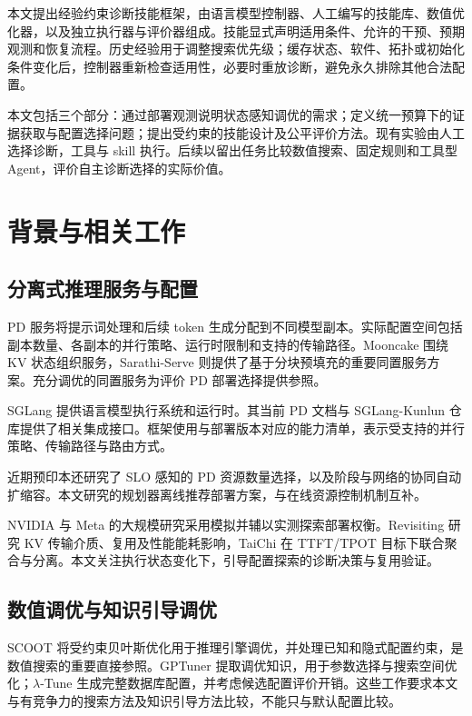 \documentclass[UTF8,11pt,a4paper,fontset=windows]{ctexart}
\begin{document}
本文提出经验约束诊断技能框架，由语言模型控制器、人工编写的技能库、数值优化器，以及独立执行器与评价器组成。技能显式声明适用条件、允许的干预、预期观测和恢复流程。历史经验用于调整搜索优先级；缓存状态、软件、拓扑或初始化条件变化后，控制器重新检查适用性，必要时重放诊断，避免永久排除其他合法配置。

本文包括三个部分：通过部署观测说明状态感知调优的需求；定义统一预算下的证据获取与配置选择问题；提出受约束的技能设计及公平评价方法。现有实验由人工选择诊断，工具与 skill 执行。后续以留出任务比较数值搜索、固定规则和工具型 Agent，评价自主诊断选择的实际价值。

\section{背景与相关工作}
\subsection{分离式推理服务与配置}
PD 服务将提示词处理和后续 token 生成分配到不同模型副本。实际配置空间包括副本数量、各副本的并行策略、运行时限制和支持的传输路径。Mooncake 围绕 KV 状态组织服务，Sarathi-Serve 则提供了基于分块预填充的重要同置服务方案\cite{mooncake2024,sarathi2024}。充分调优的同置服务为评价 PD 部署选择提供参照。

SGLang 提供语言模型执行系统和运行时\cite{sglang2024}。其当前 PD 文档与 SGLang-Kunlun 仓库提供了相关集成接口\cite{sglangpd,kunlunplugin}。框架使用与部署版本对应的能力清单，表示受支持的并行策略、传输路径与路由方式。

近期预印本还研究了 SLO 感知的 PD 资源数量选择，以及阶段与网络的协同自动扩缩容\cite{pdresources2026,tokenscale2025}。本文研究的规划器离线推荐部署方案，与在线资源控制机制互补。

NVIDIA 与 Meta 的大规模研究采用模拟并辅以实测探索部署权衡\cite{pragmatic2026,metaconfig2026}。Revisiting 研究 KV 传输介质、复用及性能能耗影响，TaiChi 在 TTFT/TPOT 目标下联合聚合与分离\cite{revisiting2026,taichi2025}。本文关注执行状态变化下，引导配置探索的诊断决策与复用验证。

\subsection{数值调优与知识引导调优}
SCOOT 将受约束贝叶斯优化用于推理引擎调优，并处理已知和隐式配置约束\cite{scoot2025}，是数值搜索的重要直接参照。GPTuner 提取调优知识，用于参数选择与搜索空间优化；$\lambda$-Tune 生成完整数据库配置，并考虑候选配置评价开销\cite{gptuner2024,lambdatune2025}。这些工作要求本文与有竞争力的搜索方法及知识引导方法比较，不能只与默认配置比较。
\end{document}
